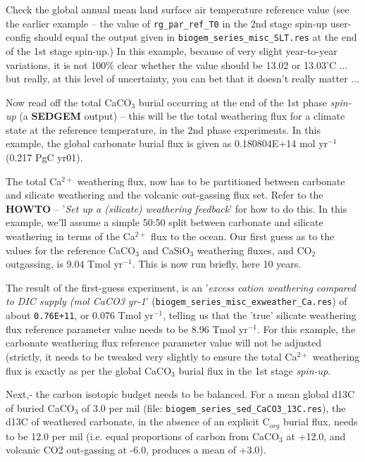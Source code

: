 \documentclass[10pt,twoside]{article}
\begin{document}
\begin{compactenum}

\item Check the global annual mean land surface air temperature reference value (see the earlier example -- the value of \texttt{rg\_par\_ref\_T0} in the 2nd stage spin-up user-config should equal the output given in \texttt{biogem\_series\_misc\_SLT.res} at the end of the 1st stage spin-up.)
In this example, because of very slight year-to-year variations, it is not 100\% clear whether the value should be 13.02 or 13.03'C ... but really, at this level of uncertainty, you can bet that it doesn't really matter ...

\item Now read off the total CaCO\(_{3}\) burial occurring at the end of the 1st phase \textit{spin-up} (a \textbf{SEDGEM} output) -- this will be the total weathering flux for a climate state at the reference temperature, in the 2nd phase experiments.
 In this example, the global carbonate burial flux is given as 0.180804E+14 mol yr\(^{-1}\) (0.217 PgC yr01).

\item The total Ca\(^{2+}\) weathering flux, now has to be partitioned between carbonate and silicate weathering and the volcanic out-gassing flux set.
Refer to the \textbf{HOWTO} -- '\textit{Set up a (silicate) weathering feedback}' for how to do this. In this example, we'll assume a simple 50:50 split between carbonate and silicate weathering in terms of the Ca\(^{2+}\) flux to the ocean. Our first guess as to the values for the reference CaCO\(_{3}\) and CaSiO\(_{3}\) weathering fluxes, and CO\(_{2}\) outgassing, is 9.04 Tmol yr\(^{-1}\). This is now run briefly, here 10 years.

\item The result of the first-guess experiment, is an '\textit{excess cation weathering compared to DIC supply (mol CaCO3 yr-1}' (\texttt{biogem\_series\_misc\_exweather\_Ca.res})
of about \texttt{0.76E+11}, or 0.076 Tmol yr\(^{-1}\), telling us that the 'true'  silicate weathering flux reference parameter
value needs to be 8.96 Tmol yr\(^{-1}\). For this example, the  carbonate weathering flux reference parameter
value will not be adjusted (strictly, it needs to be tweaked very slightly to ensure the total Ca\(^{2+}\) weathering flux is exactly as per the global CaCO\(_{3}\) burial flux in the 1st stage \textit{spin-up}.
\item Next,- the carbon isotopic budget needs to be balanced.
For a mean global d13C of buried CaCO\(_{3}\) of 3.0 per mil (file: \texttt{biogem\_series\_sed\_CaCO3\_13C.res}), the d13C of weathered carbonate, in the absence of an explicit C\(_{org}\) burial flux, needs to be 12.0 per mil (i.e. equal proportions of carbon from CaCO\(_{3}\) at +12.0, and volcanic CO2 out-gassing at -6.0, produces a mean of +3.0).


\end{compactenum}
\end{document}
